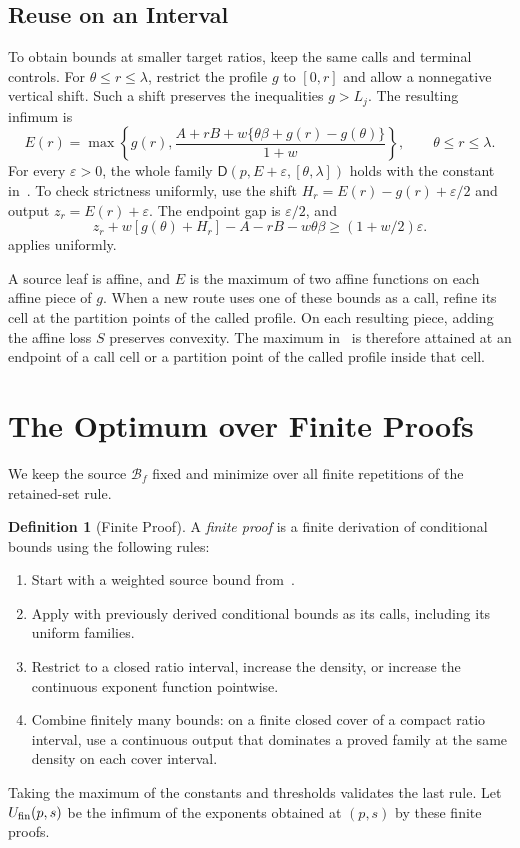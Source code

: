 \documentclass[11pt]{article}
\theoremstyle{definition}
\newtheorem{definition}[lemma]{Definition}
\newcommand{\BB}{\mathcal B}
\newcommand{\DD}{\mathsf D}
\begin{document}
\subsection{Reuse on an Interval}
To obtain bounds at smaller target ratios, keep the same calls and terminal controls.
For $\theta\le r\le\lambda$, restrict the profile $g$ to $[0,r]$ and allow a nonnegative vertical shift.
Such a shift preserves the inequalities $g>L_j$.
The resulting infimum is
\begin{equation}\label{eq:reuse}
 E(r)=\max\left\{g(r),
 \frac{A+rB+w\{\theta\beta+g(r)-g(\theta)\}}{1+w}\right\},
 \qquad\theta\le r\le\lambda.
\end{equation}
For every $\varepsilon>0$, the whole family $\DD(p,E+\varepsilon,[\theta,\lambda])$ holds with the constant in~.
To check strictness uniformly, use the shift
$H_r=E(r)-g(r)+\varepsilon/2$ and output $z_r=E(r)+\varepsilon$.
The endpoint gap is $\varepsilon/2$, and
\[
 z_r+w[g(\theta)+H_r]-A-rB-w\theta\beta
 \ge(1+w/2)\varepsilon.
\]
 applies uniformly.

A source leaf is affine, and $E$ is the maximum of two affine functions on each affine piece of $g$.
When a new route uses one of these bounds as a call, refine its cell at the partition points of the called profile.
On each resulting piece, adding the affine loss $S$ preserves convexity.
The maximum in~ is therefore attained at an endpoint of a call cell or a partition point of the called profile inside that cell.


\section{The Optimum over Finite Proofs}\label{sec:closure}
We keep the source $\BB_f$ fixed and minimize over all finite repetitions of the retained-set rule.
\begin{definition}[Finite Proof]\label{def:finite-proof}
A \emph{finite proof} is a finite derivation of conditional bounds using the following rules:
\begin{enumerate}
\item Start with a weighted source bound from~.
\item Apply  with previously derived conditional bounds as its calls, including its uniform families.
\item Restrict to a closed ratio interval, increase the density, or increase the continuous exponent function pointwise.
\item Combine finitely many bounds: on a finite closed cover of a compact ratio interval, use a continuous output that dominates a proved family at the same density on each cover interval.
\end{enumerate}
\end{definition}
Taking the maximum of the constants and thresholds validates the last rule.
Let $U_{\rm fin}(p,s)$ be the infimum of the exponents obtained at $(p,s)$ by these finite proofs.
\end{document}
